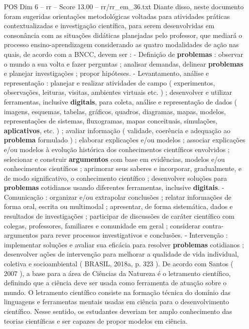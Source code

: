 \begin{textsample}{POS Dim 6 – rr – Score 13.00 – rr/rr\_em\_36.txt}
Diante disso, neste documento foram sugeridas orientações metodológicas voltadas para atividades práticas contextualizadas e investigação científica, para serem desenvolvidas em consonância com as situações didáticas planejadas pelo professor, que mediará o processo ensino-aprendizagem considerando as quatro modalidades de ação nas quais, de acordo com a BNCC, devem ser : - Definição de \textbf{problemas} : observar o mundo a sua volta e fazer perguntas ; analisar demandas, delinear \textbf{problemas} e planejar investigações ; propor hipóteses. - Levantamento, análise e representação : planejar e realizar atividades de campo ( experimentos, observações, leituras, visitas, ambientes virtuais etc. ) ; desenvolver e utilizar ferramentas, inclusive \textbf{digitais}, para coleta, análise e representação de dados ( imagens, esquemas, tabelas, gráficos, quadros, diagramas, mapas, modelos, representações de sistemas, fluxogramas, mapas conceituais, simulações, \textbf{aplicativos}, etc. ) ; avaliar informação ( validade, coerência e adequação ao \textbf{problema} formulado ) ; elaborar explicações e/ou modelos ; associar explicações e/ou modelos à evolução histórica dos conhecimentos científicos envolvidos ; selecionar e construir \textbf{argumentos} com base em evidências, modelos e/ou conhecimentos científicos ; aprimorar seus saberes e incorporar, gradualmente, e de modo significativo, o conhecimento científico ; desenvolver soluções para \textbf{problemas} cotidianos usando diferentes ferramentas, inclusive \textbf{digitais}. - Comunicação : organizar e/ou extrapolar conclusões ; relatar informações de forma oral, escrita ou multimodal ; apresentar, de forma sistemática, dados e resultados de investigações ; participar de discussões de caráter científico com colegas, professores, familiares e comunidade em geral ; considerar contra-argumentos para rever processos investigativos e conclusões. - Intervenção : implementar soluções e avaliar sua eficácia para resolver \textbf{problemas} cotidianos ; desenvolver ações de intervenção para melhorar a qualidade de vida individual, coletiva e socioambiental ( BRASIL, 2018a, p. 323 ).
De acordo com Santos ( 2007 ), a base para a área de Ciências da Natureza é o letramento científico, definindo que a ciência deve ser usada como ferramenta de atuação sobre o mundo.
O letramento científico consiste na formação técnica do domínio das linguagens e ferramentas mentais usadas em ciência para o desenvolvimento científico.
Nesse sentido, os estudantes deveriam ter amplo conhecimento das teorias científicas e ser capazes de propor modelos em ciência.

\end{textsample}
